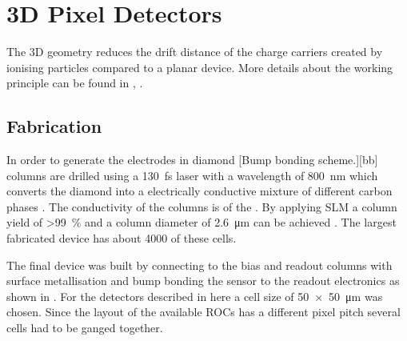 \section{3D Pixel Detectors}
The 3D geometry reduces the drift distance of the charge carriers created by ionising particles compared to a planar device. More details about the working principle can be found in \cite{parker}, \cite{3D}.
\subsection{Fabrication}
In order to generate the electrodes in diamond 
[Bump bonding scheme.][bb]
columns are drilled using a \SI{130}{\femto\second} laser with a wavelength of \SI{800}{\nano\meter} which converts the diamond into a electrically conductive mixture of different carbon phases \cite{3dfab}. The conductivity of the columns is of the . By applying \ac{SLM} a column yield of \SI{>99}{\%} and a column diameter of \SI{2.6}{\micro\meter} can be achieved \cite{slm}. The largest fabricated device has about 4000 of these cells. \par
The final device was built by connecting to the bias and readout columns with surface metallisation and bump bonding the sensor to the readout electronics as shown in . For the detectors described in here a cell size of \SI{50x50}{\micro\meter} was chosen. Since the layout of the available \acp{ROC} has a different pixel pitch several cells had to be ganged together.
